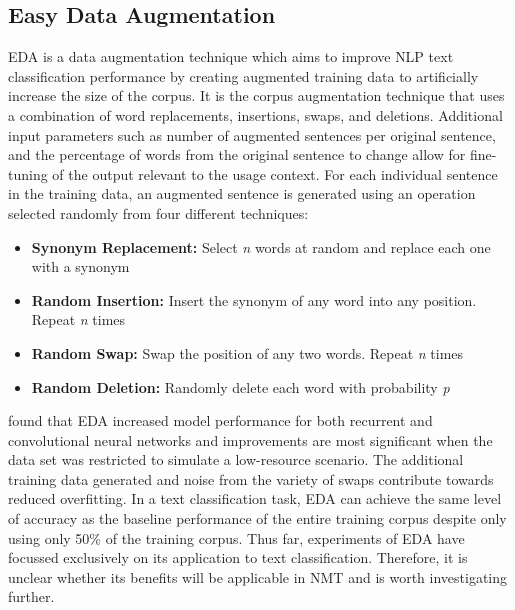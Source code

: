 \subsection{Easy Data Augmentation}
\acrfull{EDA} is a data augmentation technique which aims to improve \acrfull{NLP} text classification performance by creating augmented training data to artificially increase the size of the corpus. It is the corpus augmentation technique that uses a combination of word replacements, insertions, swaps, and deletions. Additional input parameters such as number of augmented sentences per original sentence, and the percentage of words from the original sentence to change allow for fine-tuning of the output relevant to the usage context. For each individual sentence in the training data, an augmented sentence is generated using an operation selected randomly from four different techniques:
\begin{itemize}
    \item \textbf{Synonym Replacement:} Select \textit{n} words at random and replace each one with a synonym
    \item \textbf{Random Insertion:} Insert the synonym of any word into any position. Repeat \textit{n} times
    \item \textbf{Random Swap:} Swap the position of any two words. Repeat \textit{n} times
    \item \textbf{Random Deletion:} Randomly delete each word with probability \textit{p}
\end{itemize}

\cite{wei_eda:_2019} found that \acrshort{EDA} increased model performance for both recurrent and convolutional neural networks and improvements are most significant when the data set was restricted to simulate a low-resource scenario. The additional training data generated and noise from the variety of swaps contribute towards reduced overfitting. In a text classification task, \acrshort{EDA} can achieve the same level of accuracy as the baseline performance of the entire training corpus despite only using only 50\% of the training corpus. Thus far, experiments of \acrshort{EDA} have focussed exclusively on its application to text classification. Therefore, it is unclear whether its benefits will be applicable in \acrshort{NMT} and is worth investigating further.




